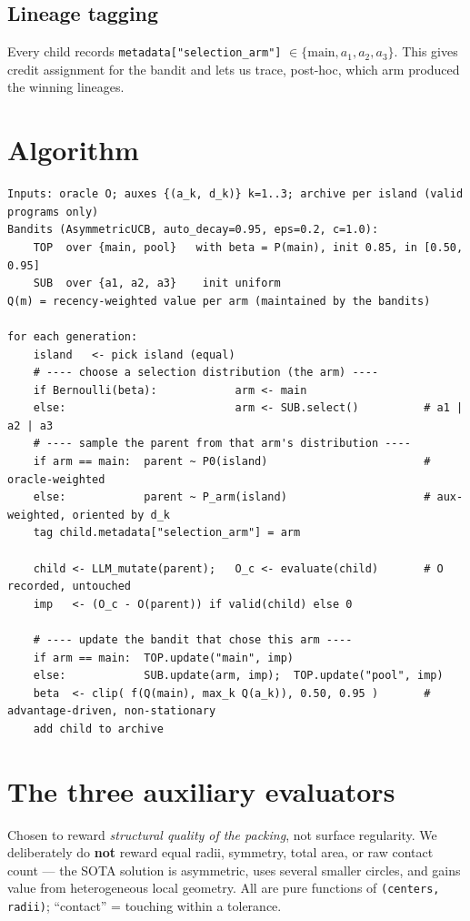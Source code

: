 \documentclass[11pt]{article}
\newcommand{\code}[1]{\texttt{\small #1}}
\begin{document}
\subsection{Lineage tagging}
Every child records \code{metadata["selection\_arm"]} $\in\{\text{main},a_1,a_2,a_3\}$. This gives
credit assignment for the bandit and lets us trace, post-hoc, which arm produced the winning lineages.

\section{Algorithm}
\begin{lstlisting}
Inputs: oracle O; auxes {(a_k, d_k)} k=1..3; archive per island (valid programs only)
Bandits (AsymmetricUCB, auto_decay=0.95, eps=0.2, c=1.0):
    TOP  over {main, pool}   with beta = P(main), init 0.85, in [0.50, 0.95]
    SUB  over {a1, a2, a3}    init uniform
Q(m) = recency-weighted value per arm (maintained by the bandits)

for each generation:
    island   <- pick island (equal)
    # ---- choose a selection distribution (the arm) ----
    if Bernoulli(beta):            arm <- main
    else:                          arm <- SUB.select()          # a1 | a2 | a3
    # ---- sample the parent from that arm's distribution ----
    if arm == main:  parent ~ P0(island)                        # oracle-weighted
    else:            parent ~ P_arm(island)                     # aux-weighted, oriented by d_k
    tag child.metadata["selection_arm"] = arm

    child <- LLM_mutate(parent);   O_c <- evaluate(child)       # O recorded, untouched
    imp   <- (O_c - O(parent)) if valid(child) else 0

    # ---- update the bandit that chose this arm ----
    if arm == main:  TOP.update("main", imp)
    else:            SUB.update(arm, imp);  TOP.update("pool", imp)
    beta  <- clip( f(Q(main), max_k Q(a_k)), 0.50, 0.95 )       # advantage-driven, non-stationary
    add child to archive
\end{lstlisting}

\section{The three auxiliary evaluators}
Chosen to reward \emph{structural quality of the packing}, not surface regularity. We deliberately
do \textbf{not} reward equal radii, symmetry, total area, or raw contact count --- the SOTA solution
is asymmetric, uses several smaller circles, and gains value from heterogeneous local geometry. All
are pure functions of \code{(centers, radii)}; ``contact'' = touching within a tolerance.
\end{document}
